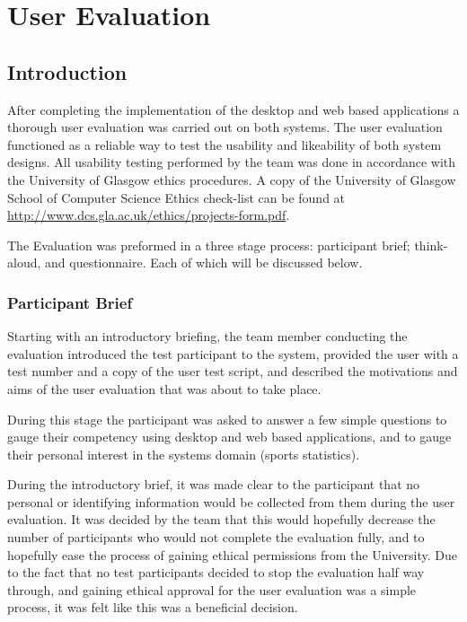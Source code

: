 \section{User Evaluation}

\subsection{Introduction}

After completing the implementation of the desktop and web based applications a
thorough user evaluation was carried out on both systems. The user evaluation
functioned as a reliable way to test the usability and likeability of both
system designs. All usability testing performed by the team was done in
accordance with the University of Glasgow ethics procedures. A copy of the
University of Glasgow School of Computer Science Ethics check-list can be found
at \url{http://www.dcs.gla.ac.uk/ethics/projects-form.pdf}.

The Evaluation was preformed in a three stage process: participant brief;
think-aloud, and questionnaire. Each of which will be discussed below.

\subsubsection{Participant Brief}

Starting with an introductory briefing, the team member conducting the
evaluation introduced the test participant to the system, provided the user
with a test number and a copy of the user test script, and described the
motivations and aims of the user evaluation that was about to take place.

During this stage the participant was asked to answer a few simple questions to
gauge their competency using desktop and web based applications, and to gauge
their personal interest in the systems domain (sports statistics).

During the introductory brief, it was made clear to the participant that no
personal or identifying information would be collected from them during the
user evaluation. It was decided by the team that this would hopefully decrease
the number of participants who would not complete the evaluation fully, and to
hopefully ease the process of gaining ethical permissions from the University.
Due to the fact that no test participants decided to stop the evaluation half
way through, and gaining ethical approval for the user evaluation was a simple
process, it was felt like this was a beneficial decision.

